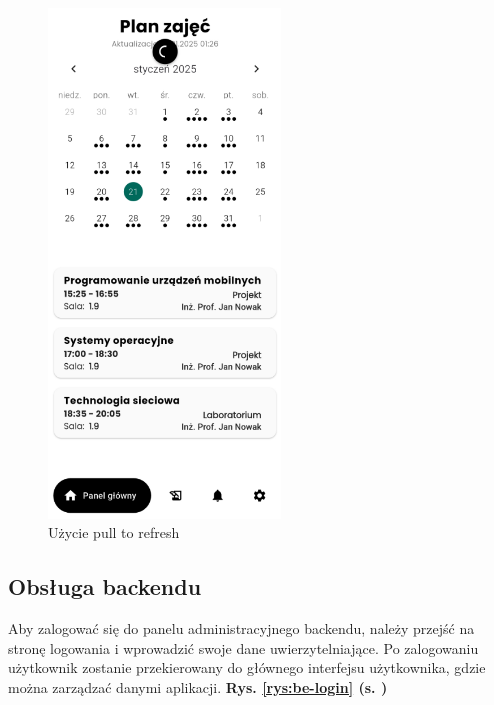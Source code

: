 \begin{figure}[h!]
	\centering
	\includegraphics[width=0.55\textwidth]{rys/pull.png}
	\caption{Użycie pull to refresh}
	\label{rys:pull}
\end{figure}

\newpage
\subsection{Obsługa backendu}
Aby zalogować się do panelu administracyjnego backendu, należy przejść na stronę logowania i wprowadzić swoje dane uwierzytelniające. Po zalogowaniu użytkownik zostanie przekierowany do głównego interfejsu użytkownika, gdzie można zarządzać danymi aplikacji. \textbf{Rys. \ref{rys:be-login} (s. \pageref{rys:be-login})}

